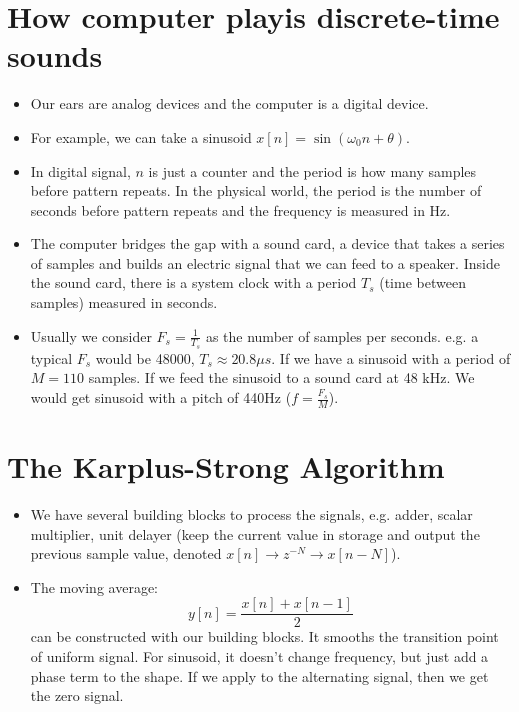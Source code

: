 \documentclass[../main.tex]{subfiles}
\begin{document}
\section{How computer playis discrete-time sounds}
\begin{itemize}
    \item Our ears are analog devices and the computer is a digital device.
    \item For example, we can take a sinusoid $x[n]=\sin(\omega_0 n +\theta)$.
    \item In digital signal, $n$ is just a counter and the period is how many samples before pattern repeats. In the physical world, the period is the number of seconds before pattern repeats and the frequency is measured in Hz.
    \item The computer bridges the gap with a sound card, a device that takes a series of samples and builds an electric signal that we can feed to a speaker. Inside the sound card, there is a system clock with a period $T_s$ (time between samples) measured in seconds.
    \item Usually we consider $F_s =\frac{1}{T_s}$ as the number of samples per seconds. e.g. a typical $F_s$ would be 48000, $T_s\approx 20.8\mu s$. If we have a sinusoid with a period of $M=110$ samples. If we feed the sinusoid to a sound card at 48 kHz. We would get sinusoid with a pitch of 440Hz ($f=\frac{F_s}{M}$).
\end{itemize}
\section{The Karplus-Strong Algorithm}
\begin{itemize}
    \item We have several building blocks to process the signals, e.g. adder, scalar multiplier, unit delayer (keep the current value in storage and output the previous sample value, denoted $x[n]\to z^{-N}\to x[n-N]$).
    \item The moving average: \[
    y[n] = \frac{x[n]+x[n-1]}{2}
    \] can be constructed with our building blocks. It smooths the transition point of uniform signal. For sinusoid, it doesn't change frequency, but just add a phase term to the shape. If we apply to the alternating signal, then we get the zero signal.
\end{itemize}
\end{document}
